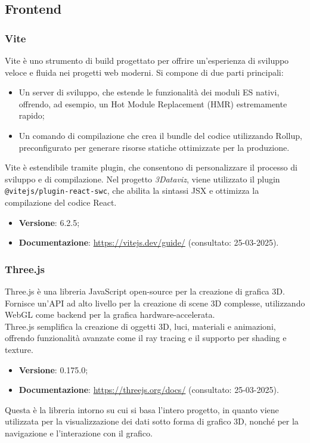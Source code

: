 \subsection{Frontend}
\subsubsection{Vite}
Vite è uno strumento di build progettato per offrire un'esperienza di sviluppo
veloce e fluida nei progetti web moderni. Si compone di due parti principali:
\begin{itemize}
    \item Un server di sviluppo, che estende le funzionalità dei moduli ES nativi,
          offrendo, ad esempio, un Hot Module Replacement (HMR) estremamente rapido;
    \item Un comando di compilazione che crea il bundle del codice utilizzando Rollup,
          preconfigurato per generare risorse statiche ottimizzate per la produzione.
\end{itemize}
Vite è estendibile tramite plugin, che consentono di personalizzare
il processo di sviluppo e di compilazione. Nel progetto \textit{3Dataviz}, viene utilizzato il
plugin \texttt{@vitejs/plugin-react-swc}, che abilita la sintassi JSX e ottimizza la compilazione del codice React.

\begin{itemize}
    \item \textbf{Versione}: 6.2.5;
    \item \textbf{Documentazione}: \url{https://vitejs.dev/guide/} (consultato:
          25-03-2025).
\end{itemize}

\subsubsection{Three.js}
Three.js è una libreria JavaScript open-source per la creazione di grafica 3D.
Fornisce un'API ad alto livello per la creazione di scene 3D complesse,
utilizzando WebGL come backend per la grafica hardware-accelerata. \\Three.js
semplifica la creazione di oggetti 3D, luci, materiali e animazioni, offrendo
funzionalità avanzate come il ray tracing e il supporto per shading e texture.
\begin{itemize}
    \item \textbf{Versione}: 0.175.0;
    \item \textbf{Documentazione}: \url{https://threejs.org/docs/} (consultato:
          25-03-2025).
\end{itemize}
Questa è la libreria intorno su cui si basa l'intero progetto, in quanto
viene utilizzata per la visualizzazione dei dati sotto forma di grafico 3D, nonché per la
navigazione e l'interazione con il grafico.

